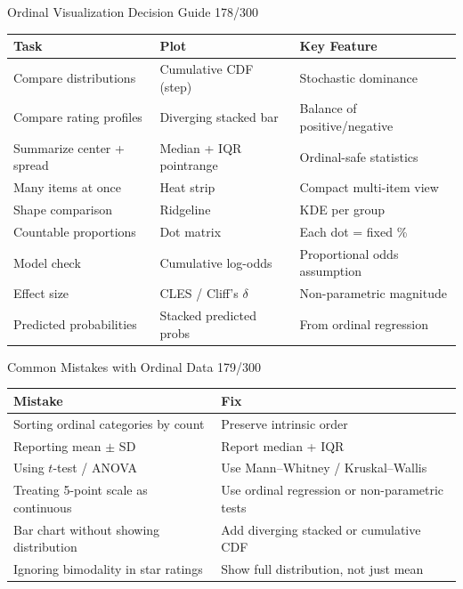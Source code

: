\documentclass[10pt]{beamer}
\newcommand{\smark}[1]{\hfill{\scriptsize\color{codegray}#1}}
\begin{document}
\begin{frame}{Ordinal Visualization Decision Guide}
\smark{178/300}
\centering\small
\begin{tabular}{@{}lll@{}}
    \toprule
    \textbf{Task} & \textbf{Plot} & \textbf{Key Feature} \\
    \midrule
    Compare distributions        & Cumulative CDF (step)     & Stochastic dominance \\
    Compare rating profiles      & Diverging stacked bar     & Balance of positive/negative \\
    Summarize center + spread    & Median + IQR pointrange   & Ordinal-safe statistics \\
    Many items at once           & Heat strip                & Compact multi-item view \\
    Shape comparison             & Ridgeline                 & KDE per group \\
    Countable proportions        & Dot matrix                & Each dot = fixed \% \\
    Model check                  & Cumulative log-odds       & Proportional odds assumption \\
    Effect size                  & CLES / Cliff's $\delta$   & Non-parametric magnitude \\
    Predicted probabilities      & Stacked predicted probs   & From ordinal regression \\
    \bottomrule
\end{tabular}
\end{frame}

\begin{frame}{Common Mistakes with Ordinal Data}
\smark{179/300}
\centering\small
\begin{tabular}{@{}ll@{}}
    \toprule
    \textbf{Mistake} & \textbf{Fix} \\
    \midrule
    Sorting ordinal categories by count    & Preserve intrinsic order \\
    Reporting mean $\pm$ SD                & Report median + IQR \\
    Using $t$-test / ANOVA                 & Use Mann--Whitney / Kruskal--Wallis \\
    Treating 5-point scale as continuous   & Use ordinal regression or non-parametric tests \\
    Bar chart without showing distribution & Add diverging stacked or cumulative CDF \\
    Ignoring bimodality in star ratings    & Show full distribution, not just mean \\
    \bottomrule
\end{tabular}
\end{frame}
\end{document}
